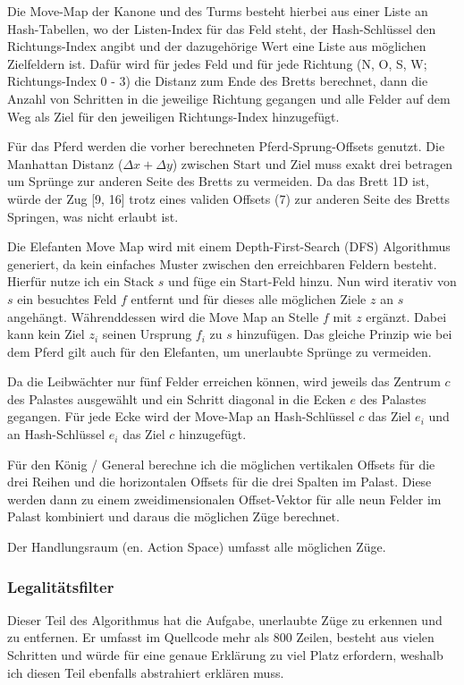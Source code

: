 \documentclass[
  manuscript=article,  %
  layout=publish,  %
  year=2023,
  volume=1,
]{extra/joas}
\begin{document}
Die Move-Map der Kanone und des Turms besteht hierbei aus einer Liste an Hash-Tabellen, wo der Listen-Index für das Feld steht, der  Hash-Schlüssel den Richtungs-Index angibt und der dazugehörige Wert eine Liste aus möglichen Zielfeldern ist. Dafür wird für jedes Feld und für jede Richtung (N, O, S, W; Richtungs-Index 0 - 3) die Distanz zum Ende des Bretts berechnet, dann die Anzahl von Schritten in die jeweilige Richtung  gegangen und alle Felder auf dem Weg als Ziel für den jeweiligen Richtungs-Index hinzugefügt.

Für das Pferd werden die vorher berechneten Pferd-Sprung-Offsets genutzt. Die Manhattan Distanz ($\Delta x + \Delta y$) zwischen Start und Ziel muss exakt drei betragen um Sprünge zur anderen Seite des Bretts zu vermeiden. Da das Brett 1D ist, würde der Zug [9, 16] trotz eines validen Offsets (7) zur anderen Seite des Bretts Springen, was nicht erlaubt ist.

Die Elefanten Move Map wird mit einem Depth-First-Search (DFS) Algorithmus generiert, da kein einfaches Muster zwischen den erreichbaren Feldern besteht. Hierfür nutze ich ein Stack $s$ und füge ein Start-Feld hinzu. Nun wird iterativ von $s$ ein besuchtes Feld $f$ entfernt und für dieses alle möglichen Ziele $z$ an $s$ angehängt. Währenddessen wird die Move Map an Stelle $f$ mit $z$ ergänzt. Dabei kann kein Ziel $z_i$ seinen Ursprung $f_i$ zu $s$ hinzufügen. Das gleiche Prinzip wie bei dem Pferd gilt auch für den Elefanten, 
um unerlaubte Sprünge zu vermeiden.

Da die Leibwächter nur fünf Felder erreichen können, wird jeweils das Zentrum $c$ des Palastes ausgewählt und ein Schritt diagonal in die Ecken $e$ des Palastes gegangen. Für jede Ecke wird der Move-Map an Hash-Schlüssel $c$ das Ziel $e_i$ und an Hash-Schlüssel $e_i$ das Ziel $c$ hinzugefügt.

Für den König / General berechne ich die möglichen vertikalen Offsets für die drei Reihen und die horizontalen Offsets für die drei Spalten im Palast. Diese werden dann zu einem zweidimensionalen Offset-Vektor für alle neun Felder im Palast kombiniert und daraus die möglichen Züge berechnet. 

Der Handlungsraum (en. Action Space) umfasst alle möglichen Züge.

\subsubsection{Legalitätsfilter}
Dieser Teil des Algorithmus hat die Aufgabe, unerlaubte Züge zu erkennen und zu entfernen. Er umfasst im Quellcode mehr als 800 Zeilen, besteht aus vielen Schritten und würde für eine genaue Erklärung zu viel Platz erfordern, weshalb ich diesen Teil ebenfalls abstrahiert erklären muss.
\end{document}
